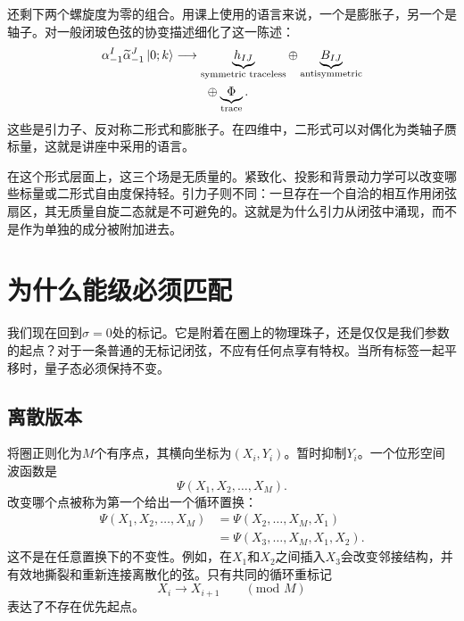 还剩下两个螺旋度为零的组合。用课上使用的语言来说，一个是膨胀子，另一个是轴子。对一般闭玻色弦的协变描述细化了这一陈述：
\begin{equation}
  \begin{aligned}
    \alpha_{-1}^{I}\widetilde\alpha_{-1}^{J}\left\lvert0;k\right\rangle
    &\longrightarrow
    \underbrace{h_{IJ}}_{\text{symmetric traceless}}
    \oplus
    \underbrace{B_{IJ}}_{\text{antisymmetric}}\\
    &\hspace{2.5em}\oplus
    \underbrace{\Phi}_{\text{trace}}.
  \end{aligned}
  \label{eq:l04-massless-tensor-decomposition}
\end{equation}
这些是引力子、反对称二形式和膨胀子。在四维中，二形式可以对偶化为类轴子赝标量，这就是讲座中采用的语言。

在这个形式层面上，这三个场是无质量的。紧致化、投影和背景动力学可以改变哪些标量或二形式自由度保持轻。引力子则不同：一旦存在一个自洽的相互作用闭弦扇区，其无质量自旋二态就是不可避免的。这就是为什么引力从闭弦中涌现，而不是作为单独的成分被附加进去。

\section{为什么能级必须匹配}

我们现在回到\(\sigma=0\)处的标记。它是附着在圈上的物理珠子，还是仅仅是我们参数的起点？对于一条普通的无标记闭弦，不应有任何点享有特权。当所有标签一起平移时，量子态必须保持不变。

\subsection{离散版本}

将圈正则化为\(M\)个有序点，其横向坐标为\((X_i,Y_i)\)。暂时抑制\(Y_i\)。一个位形空间波函数是
\begin{equation}
  \Psi(X_1,X_2,\ldots,X_M).
\end{equation}
改变哪个点被称为第一个给出一个循环置换：
\begin{align}
  \Psi(X_1,X_2,\ldots,X_M)
  &=
  \Psi(X_2,\ldots,X_M,X_1)\nonumber\\
  &=
  \Psi(X_3,\ldots,X_M,X_1,X_2).
  \label{eq:l04-cyclic-wavefunction}
\end{align}
这不是在任意置换下的不变性。例如，在\(X_1\)和\(X_2\)之间插入\(X_3\)会改变邻接结构，并有效地撕裂和重新连接离散化的弦。只有共同的循环重标记
\begin{equation}
  X_i\longrightarrow X_{i+1}\qquad(\text{mod }M)
  \label{eq:l04-discrete-shift}
\end{equation}
表达了不存在优先起点。

